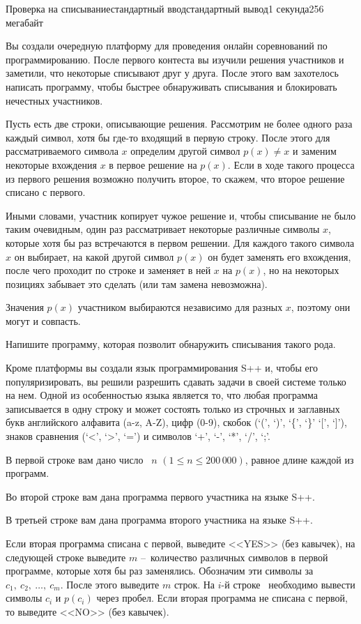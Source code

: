 \begin{problem}{Проверка на списывание}{стандартный ввод}{стандартный вывод}{1 секунда}{256 мегабайт}

Вы создали очередную платформу для проведения онлайн соревнований по программированию. После первого контеста вы изучили решения участников и заметили, что некоторые списывают друг у друга. После этого вам захотелось написать программу, чтобы быстрее обнаруживать списывания и блокировать нечестных участников. 

Пусть есть две строки, описывающие решения. Рассмотрим не более одного раза каждый символ, хотя бы где-то входящий в первую строку. После этого для рассматриваемого символа $x$ определим другой символ $p(x) \neq x$ и заменим некоторые вхождения $x$ в первое решение на $p(x)$. Если в ходе такого процесса из первого решения возможно получить второе, то скажем, что второе решение списано с первого. 

Иными словами, участник копирует чужое решение и, чтобы списывание не было таким очевидным, один раз рассматривает некоторые различные символы $x$, которые хотя бы раз встречаются в первом решении. Для каждого такого символа $x$ он выбирает, на какой другой символ $p(x)$ он будет заменять его вхождения, после чего проходит по строке и заменяет в ней $x$ на $p(x)$, но на некоторых позициях забывает это сделать (или там замена невозможна).

Значения $p(x)$ участником выбираются независимо для разных $x$, поэтому они могут и совпасть.

Напишите программу, которая позволит обнаружить списывания такого рода.

\InputFile
Кроме платформы вы создали язык программирования S++ и, чтобы его популяризировать, вы решили разрешить сдавать задачи в своей системе только на нем. Одной из особенностью языка является то, что любая программа записывается в одну строку и может состоять только из строчных и заглавных букв английского алфавита (a-z, A-Z), цифр (0-9), скобок (`(', `)', `\{', `\}' `[', `]'), знаков сравнения (`<', `>', `=') и символов `+', `-', `*', `/', `;'. 

В первой строке вам дано число  $n$ $(1 \leqslant  n \leqslant 200\,000)$, равное длине каждой из программ.

Во второй строке вам дана программа первого участника на языке S++.

В третьей строке вам дана программа второго участника на языке S++.


\OutputFile
Если вторая программа списана с первой, выведите <<YES>> (без кавычек), на следующей строке выведите $m$ -- количество различных символов в первой программе, которые хотя бы раз заменялись. Обозначим эти символы за $c_1,\ c_2,\ \ldots, \  c_m$. После этого выведите $m$ строк. На $i$-й строке  необходимо вывести символы $c_i$ и $p(c_i)$ через пробел. Если вторая программа не списана с первой, то выведите <<NO>> (без кавычек).



\end{problem}

